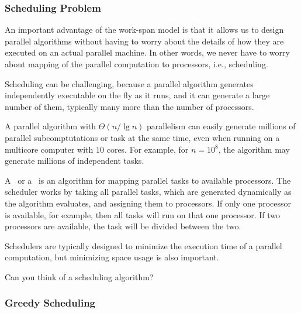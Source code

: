 \subsubsection{Scheduling Problem}
\begin{flex}
\begin{gram}
An important advantage of the work-span model is that it allows us to
design parallel algorithms without having to worry about the details
of how they are executed on an actual parallel machine. 
%
In other words, we never have to worry about mapping of the parallel
computation to processors, i.e., scheduling. 

Scheduling can be challenging, because a parallel algorithm generates
independently executable  on the fly as it runs, and it
can generate a large number of them, typically many more than the
number of processors.
%
\end{gram}

\begin{example}
A parallel algorithm with $\Theta(n/\lg{n})$ parallelism can easily
generate millions of parallel subcomptutations or task at the same time,
even when running on a multicore computer with $10$ cores.
%
For example, for $n = 10^8$, the algorithm may generate millions of
independent tasks.
\end{example}
\end{flex}

\begin{definition}[Scheduler]
A~ or a~ is an algorithm
for mapping parallel tasks to available processors.
%
%
The scheduler works by taking all parallel tasks, which are generated
dynamically as the algorithm evaluates, and assigning them to
processors.  
%
If only one processor is available, for example, then all
tasks will run on that one processor.  If two processors are available,
the task will be divided between the two.

Schedulers are typically designed to minimize the execution time of a
parallel computation,
%
but 
%
minimizing space usage is also important.
\end{definition}

\begin{teachask}
Can you think of a scheduling algorithm?
\end{teachask}

\subsubsection{Greedy Scheduling}


